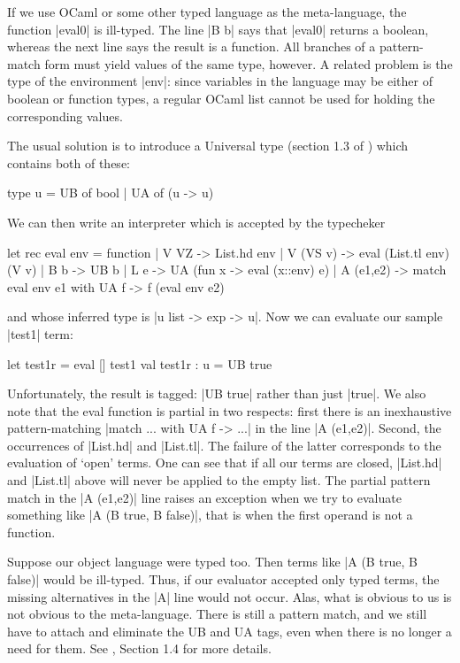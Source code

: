 \documentclass[preprint]{sigplanconf}
\let\cite=\citep
\begin{document}
If we use OCaml or some other typed language as the meta-language, 
the function |eval0| is ill-typed. The line |B b|
says that |eval0| returns a boolean, whereas the next line says
the result is a function. All branches of a pattern-match form must
yield values of the same type, however. 
A related problem is the type of the environment |env|: since variables
in the language may be either of boolean or function types, a regular
OCaml list cannot be used for holding the corresponding values. 

The usual solution is to introduce a Universal type (section 1.3 of
\cite{WalidICFP02}) which contains both of these:

\begin{code}
  type u = UB of bool | UA of (u -> u)
\end{code}

We can then write an interpreter which is accepted by the typecheker
\begin{code}
let rec eval env = function
  | V VZ -> List.hd env
  | V (VS v) -> eval (List.tl env) (V v)
  | B b -> UB b
  | L e -> UA (fun x -> eval (x::env) e)
  | A (e1,e2) -> match eval env e1 with UA f -> f (eval env e2)
\end{code}
and whose inferred type is |u list -> exp -> u|. Now we can evaluate
our sample |test1| term:

\begin{code}
let test1r = eval [] test1
val test1r : u = UB true 
\end{code}

Unfortunately, the result is tagged: |UB true| rather than just
|true|. We also note that the eval function is partial in two
respects: first there is an inexhaustive pattern-matching 
|match ... with UA f -> ...| in the 
line |A (e1,e2)|.
Second, the occurrences of |List.hd| and |List.tl|.
The failure of the latter corresponds to the evaluation of `open'
terms. One can see that if all our terms are closed, |List.hd| and
|List.tl| above will never be applied to the empty list. The partial
pattern match in the |A (e1,e2)| line raises an exception when we try to
evaluate something like |A (B true, B false)|, that is when the first
operand is not a function. 

Suppose our object language were typed too. Then terms like
|A (B true, B false)| would be ill-typed. Thus, if our evaluator
accepted only typed terms, the missing alternatives in the |A|
line would not occur. Alas, what is obvious to us is not obvious to
the meta-language. There is still a pattern match, and we still have
to attach and eliminate the UB and UA tags, even when there is no
longer a need for them. See \cite{WalidICFP02}, Section 1.4 for more details.
\end{document}
